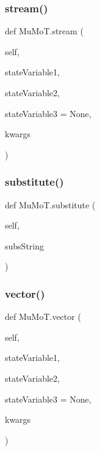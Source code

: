 \mbox{\label{namespace_mu_mo_t_a9cefa7d2a2add86634777e2bad0363a8}} 
\subsubsection{\texorpdfstring{stream()}{stream()}}
{\footnotesize\ttfamily def Mu\+Mo\+T.\+stream (\begin{DoxyParamCaption}\item[{}]{self,  }\item[{}]{state\+Variable1,  }\item[{}]{state\+Variable2,  }\item[{}]{state\+Variable3 = {\ttfamily None},  }\item[{}]{kwargs }\end{DoxyParamCaption})}

\mbox{\label{namespace_mu_mo_t_adc8f925bf788b5b3263492c4611fa617}} 
\subsubsection{\texorpdfstring{substitute()}{substitute()}}
{\footnotesize\ttfamily def Mu\+Mo\+T.\+substitute (\begin{DoxyParamCaption}\item[{}]{self,  }\item[{}]{subs\+String }\end{DoxyParamCaption})}

\mbox{\label{namespace_mu_mo_t_ac6d72bda95dbd1b7ea9773ebaabe6eb7}} 
\subsubsection{\texorpdfstring{vector()}{vector()}}
{\footnotesize\ttfamily def Mu\+Mo\+T.\+vector (\begin{DoxyParamCaption}\item[{}]{self,  }\item[{}]{state\+Variable1,  }\item[{}]{state\+Variable2,  }\item[{}]{state\+Variable3 = {\ttfamily None},  }\item[{}]{kwargs }\end{DoxyParamCaption})}

